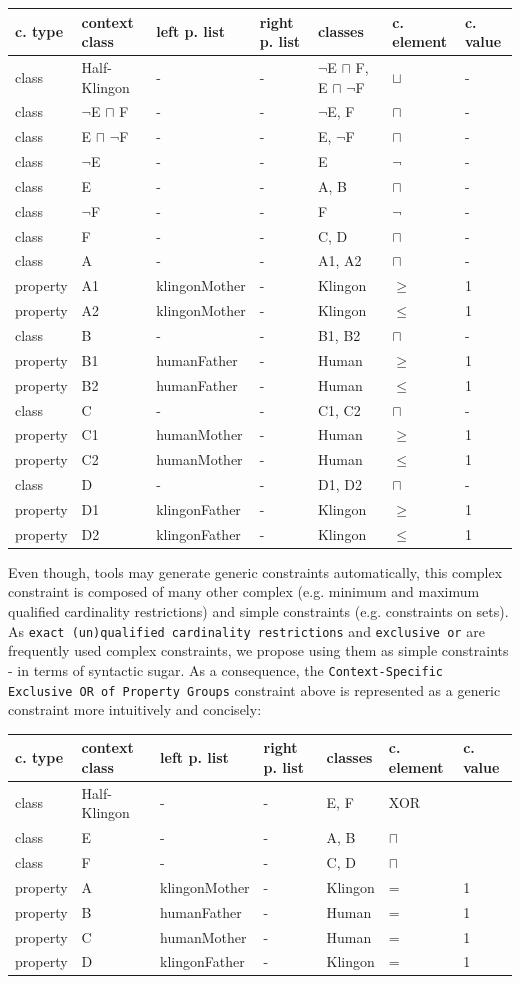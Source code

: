 \documentclass{llncs}
\newcommand{\ms}[1]{\texttt{#1}}
\newenvironment{gcotable}{
  \scriptsize
  \sffamily
  \vspace{0.3cm}
	\begin{center}
  \begin{tabular}{l|l|l|l|l|l|l}
  \hline
  \textbf{c. type} & \textbf{context class} & \textbf{left p. list} & \textbf{right p. list} & \textbf{classes} & \textbf{c. element} & \textbf{c. value} \\
  \hline

}{
  \hline
  \end{tabular}
	\end{center}
}
\begin{document}
\begin{gcotable}
class & Half-Klingon & - & - & $\neg$E $\sqcap$ F, E $\sqcap$ $\neg$F & $\sqcup$ & - \\
class & $\neg$E $\sqcap$ F & - & - & $\neg$E, F & $\sqcap$ & - \\
class & E $\sqcap$ $\neg$F & - & - & E, $\neg$F & $\sqcap$ & - \\
class & $\neg$E & - & - & E & $\neg$ & - \\
class & E & - & - & A, B & $\sqcap$ & - \\
class & $\neg$F & - & - & F & $\neg$ & - \\
class & F & - & - & C, D & $\sqcap$ & - \\
class & A & - & - & A1, A2 & $\sqcap$ & - \\
property & A1 & klingonMother & - & Klingon & $\geq$ & 1 \\
property & A2 & klingonMother & - & Klingon & $\leq$ & 1 \\
class & B & - & - & B1, B2 & $\sqcap$ & - \\
property & B1 & humanFather & - & Human & $\geq$ & 1 \\
property & B2 & humanFather & - & Human & $\leq$ & 1 \\
class & C & - & - & C1, C2 & $\sqcap$ & - \\
property & C1 & humanMother & - & Human & $\geq$ & 1 \\
property & C2 & humanMother & - & Human & $\leq$ & 1 \\
class & D & - & - & D1, D2 & $\sqcap$ & - \\
property & D1 & klingonFather & - & Klingon & $\geq$ & 1 \\
property & D2 & klingonFather & - & Klingon & $\leq$ & 1 \\
\end{gcotable}

Even though, tools may generate generic constraints automatically, this complex constraint is composed of many other complex (e.g. minimum and maximum qualified cardinality restrictions) and simple constraints (e.g. constraints on sets).
As \ms{exact (un)qualified cardinality restrictions} and \ms{exclusive or} are frequently used complex constraints,
we propose using them as simple constraints - 	in terms of syntactic sugar.
As a consequence, the \ms{Context-Specific Exclusive OR of Property Groups} constraint above is represented as a generic constraint more intuitively and concisely:

\begin{gcotable}
class & Half-Klingon & - & - & E, F & XOR \\
class & E & - & - & A, B & $\sqcap$ \\
class & F & - & - & C, D & $\sqcap$ \\
property & A & klingonMother & - & Klingon & = & 1 \\
property & B & humanFather & - & Human & = & 1 \\
property & C & humanMother & - & Human & = & 1 \\
property & D & klingonFather & - & Klingon & = & 1 \\
\end{gcotable}
\end{document}
